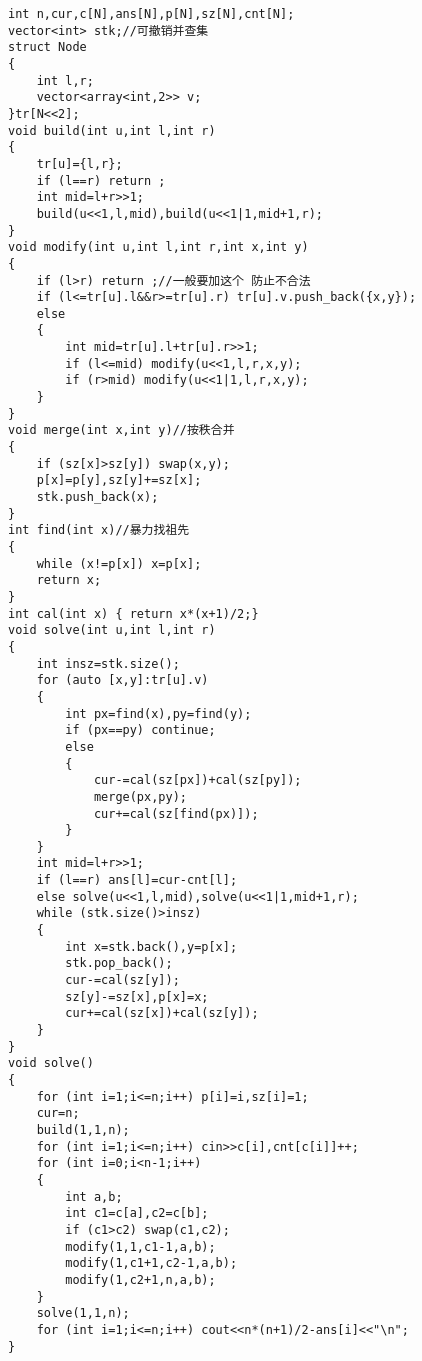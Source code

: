 \documentclass[a4paper]{ctexart}
\begin{document}
\begin{lstlisting}
int n,cur,c[N],ans[N],p[N],sz[N],cnt[N];
vector<int> stk;//可撤销并查集
struct Node
{
    int l,r;
    vector<array<int,2>> v;
}tr[N<<2];
void build(int u,int l,int r)
{
    tr[u]={l,r};
    if (l==r) return ;
    int mid=l+r>>1;
    build(u<<1,l,mid),build(u<<1|1,mid+1,r);
}
void modify(int u,int l,int r,int x,int y)
{
    if (l>r) return ;//一般要加这个 防止不合法
    if (l<=tr[u].l&&r>=tr[u].r) tr[u].v.push_back({x,y});
    else
    {
        int mid=tr[u].l+tr[u].r>>1;
        if (l<=mid) modify(u<<1,l,r,x,y);
        if (r>mid) modify(u<<1|1,l,r,x,y);
    }
}
void merge(int x,int y)//按秩合并
{
    if (sz[x]>sz[y]) swap(x,y);
    p[x]=p[y],sz[y]+=sz[x];
    stk.push_back(x);
}
int find(int x)//暴力找祖先
{
    while (x!=p[x]) x=p[x];
    return x;
}
int cal(int x) { return x*(x+1)/2;}
void solve(int u,int l,int r)
{
    int insz=stk.size();
    for (auto [x,y]:tr[u].v)
    {
        int px=find(x),py=find(y);
        if (px==py) continue;
        else
        {
            cur-=cal(sz[px])+cal(sz[py]);
            merge(px,py);
            cur+=cal(sz[find(px)]);
        }
    }
    int mid=l+r>>1;
    if (l==r) ans[l]=cur-cnt[l];
    else solve(u<<1,l,mid),solve(u<<1|1,mid+1,r);
    while (stk.size()>insz)
    {
        int x=stk.back(),y=p[x];
        stk.pop_back();
        cur-=cal(sz[y]);
        sz[y]-=sz[x],p[x]=x;
        cur+=cal(sz[x])+cal(sz[y]);
    }
}
void solve()
{
    for (int i=1;i<=n;i++) p[i]=i,sz[i]=1;
    cur=n;
    build(1,1,n);
    for (int i=1;i<=n;i++) cin>>c[i],cnt[c[i]]++;
    for (int i=0;i<n-1;i++)
    {
        int a,b;
        int c1=c[a],c2=c[b];
        if (c1>c2) swap(c1,c2);
        modify(1,1,c1-1,a,b);
        modify(1,c1+1,c2-1,a,b);
        modify(1,c2+1,n,a,b);
    }
    solve(1,1,n);
    for (int i=1;i<=n;i++) cout<<n*(n+1)/2-ans[i]<<"\n";
}
\end{lstlisting}
\end{document}
